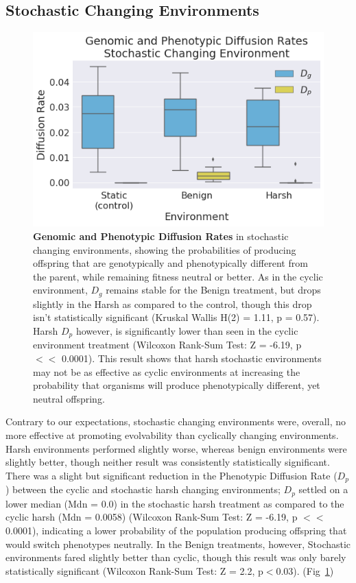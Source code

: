 \documentclass[PhD]{msu-thesis}
\begin{document}
\subsection{Stochastic Changing Environments}
	\begin{figure}[!h] %
	\includegraphics[width=0.75\columnwidth]{figures/CE/CSE_D_g_D_p__box.png}
	\caption{\textbf{Genomic and Phenotypic Diffusion Rates} in stochastic changing environments, showing the probabilities of producing offspring that are genotypically and phenotypically different from the parent, while remaining fitness neutral or better. As in the cyclic environment, $D_g$ remains stable for the Benign treatment, but drops slightly in the Harsh as compared to the control, though this drop isn't statistically significant (Kruskal Wallis H(2) = 1.11, p = 0.57). Harsh $D_p$ however, is significantly lower than seen in the cyclic environment treatment (Wilcoxon Rank-Sum Test: Z = -6.19, p $<<$ 0.0001). This result shows that harsh stochastic environments may not be as effective as cyclic environments at increasing the probability that organisms will produce phenotypically different, yet neutral offspring.
	}\label{fig:CSE_diffusion_rate}
	\end{figure}
Contrary to our expectations, stochastic changing environments were, overall, no more effective at
promoting evolvability than cyclically changing environments. Harsh environments performed slightly worse, whereas benign environments were slightly better, though neither result was consistently statistically significant. There was a slight but significant reduction in the Phenotypic Diffusion Rate ($D_p$) between the cyclic and stochastic harsh changing environments; $D_p$ settled on a lower median (Mdn = 0.0) in the stochastic harsh treatment as compared to the cyclic harsh (Mdn = 0.0058) (Wilcoxon Rank-Sum Test: Z = -6.19, p $<<$ 0.0001), indicating a lower probability of the population producing offspring that would switch phenotypes neutrally. In the Benign treatments, however, Stochastic environments fared slightly better than cyclic, though this result was only barely statistically significant (Wilcoxon Rank-Sum Test: Z = 2.2, p$<$0.03). (Fig~\ref{fig:CSE_diffusion_rate}) 
\end{document}
